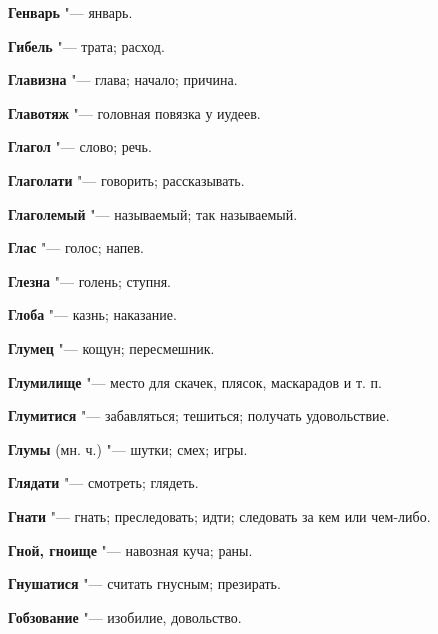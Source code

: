\begin{mymulticols}{2}
\noindent\textbf{Генварь} "--- январь. 




\noindent\textbf{Гибель} "--- трата; расход. 




\noindent\textbf{Главизна} "--- глава; начало; причина. 




\noindent\textbf{Главотяж} "--- головная повязка у иудеев. 




\noindent\textbf{Глагол} "--- слово; речь. 




\noindent\textbf{Глаголати} "--- говорить; рассказывать. 




\noindent\textbf{Глаголемый} "--- называемый; так называемый. 




\noindent\textbf{Глас} "--- голос; напев. 




\noindent\textbf{Глезна} "--- голень; ступня. 




\noindent\textbf{Глоба} "--- казнь; наказание. 




\noindent\textbf{Глумец} "--- кощун; пересмешник. 




\noindent\textbf{Глумилище} "--- место для скачек, плясок, маскарадов и т. п. 




\noindent\textbf{Глумитися} "--- забавляться; тешиться; получать удовольствие. 




\noindent\textbf{Глумы} (мн. ч.) "--- шутки; смех; игры. 




\noindent\textbf{Глядати} "--- смотреть; глядеть. 




\noindent\textbf{Гнати} "--- гнать; преследовать; идти; следовать за кем или чем-либо. 




\noindent\textbf{Гной, гноище} "--- навозная куча; раны. 




\noindent\textbf{Гнушатися} "--- считать гнусным; презирать. 




\noindent\textbf{Гобзование} "--- изобилие, довольство. 





\end{mymulticols}

